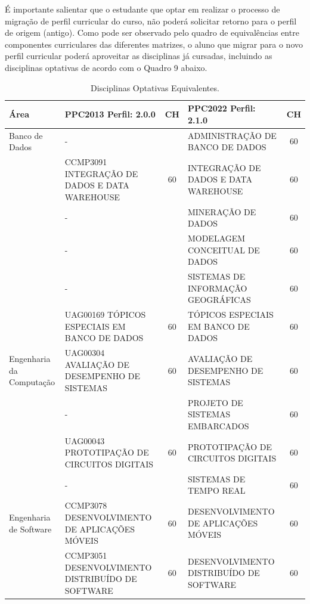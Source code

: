 \documentclass[
	12pt,				%
	openright,			%
  oneside,     %
	a4paper,			%
	chapter=TITLE,		%
	english,			%
	french,				%
	spanish,			%
	brazil				%
	]{abntex2}
\begin{document}
  É importante salientar que o estudante que optar em realizar o processo de migração de perfil curricular do curso, não poderá solicitar retorno para o perfil de origem (antigo). Como pode ser observado pelo quadro de equivalências entre componentes curriculares das diferentes matrizes, o aluno que migrar para o novo perfil curricular poderá aproveitar as disciplinas já cursadas, incluindo as disciplinas optativas de acordo com o Quadro 9 abaixo.
  
  \begin{center}
    
    \begin{tiny}
      \begin{longtable}{p{2cm}p{5.4cm}cp{5.4cm}c}
        \caption{\label{quadro:disciplinas-optativas-equivalentes}Disciplinas Optativas Equivalentes.}\\
      \toprule
      \textbf{Área} & \textbf{PPC2013 Perfil: 2.0.0} & \textbf{CH} & \textbf{PPC2022 Perfil: 2.1.0} & \textbf{CH}\\
      \midrule
    Banco de Dados & - & & ADMINISTRAÇÃO DE BANCO DE DADOS & 60 \\ \cline{2-5}
      & CCMP3091 INTEGRAÇÃO DE DADOS E DATA WAREHOUSE & 60 & INTEGRAÇÃO DE DADOS E DATA WAREHOUSE & 60 \\ \cline{2-5}
      & - & & MINERAÇÃO DE DADOS & 60 \\ \cline{2-5}
      & - & & MODELAGEM CONCEITUAL DE DADOS & 60 \\ \cline{2-5}
      & - & & SISTEMAS DE INFORMAÇÃO GEOGRÁFICAS & 60 \\ \cline{2-5}
      & UAG00169 TÓPICOS ESPECIAIS EM BANCO DE DADOS & 60 & TÓPICOS ESPECIAIS EM BANCO DE DADOS & 60 \\ \midrule
    Engenharia da Computação & UAG00304 AVALIAÇÃO DE DESEMPENHO DE SISTEMAS & 60 & AVALIAÇÃO DE DESEMPENHO DE SISTEMAS & 60 \\ \cline{2-5}
      & - & & PROJETO DE SISTEMAS EMBARCADOS & 60 \\ \cline{2-5}
      & UAG00043 PROTOTIPAÇÃO DE CIRCUITOS DIGITAIS & 60 & PROTOTIPAÇÃO DE CIRCUITOS DIGITAIS & 60 \\ \cline{2-5}
      & - & & SISTEMAS DE TEMPO REAL & 60 \\ \midrule
    Engenharia de Software & CCMP3078 DESENVOLVIMENTO DE APLICAÇÕES MÓVEIS & 60 & DESENVOLVIMENTO DE APLICAÇÕES MÓVEIS & 60 \\ \cline{2-5}
    & CCMP3051 DESENVOLVIMENTO DISTRIBUÍDO DE SOFTWARE & 60 & DESENVOLVIMENTO DISTRIBUÍDO DE SOFTWARE & 60 \\ \cline{2-5}

\end{longtable}
\end{tiny}
\end{center}
\end{document}
